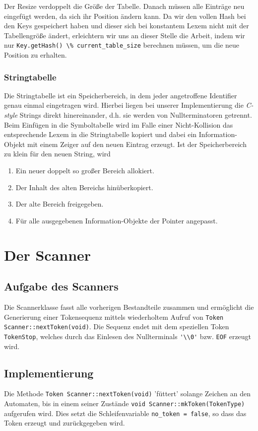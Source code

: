 \documentclass[
a4paper,   %
11pt,      %
oneside,   %
onecolumn, %
final      %
]{article}
\newcommand{\code}[1]{\lstinline$#1$}
\begin{document}
Der Resize verdoppelt die Größe der Tabelle.
Danach müssen alle Einträge neu eingefügt werden, da sich ihr Position ändern kann.
Da wir den vollen Hash bei den Keys gespeichert haben und dieser sich bei konstantem Lexem nicht mit der Tabellengröße ändert, erleichtern wir uns an dieser Stelle die Arbeit, indem wir nur \code{Key.getHash() \% current_table_size} berechnen müssen, um die neue Position zu erhalten.

\subsubsection{Stringtabelle}
Die Stringtabelle ist ein Speicherbereich, in dem jeder angetroffene Identifier genau einmal eingetragen wird.
Hierbei liegen bei unserer Implementierung die \emph{C-style} Strings direkt hinereinander, d.h. sie werden von Nullterminatoren getrennt.
Beim Einfügen in die Symboltabelle wird im Falle einer Nicht-Kollision das entsprechende Lexem in die Stringtabelle kopiert und dabei ein Information-Objekt mit einem Zeiger auf den neuen Eintrag erzeugt.
Ist der Speicherbereich zu klein für den neuen String, wird
\begin{enumerate}
\item Ein neuer doppelt so großer Bereich allokiert. 
\item Der Inhalt des alten Bereichs hinüberkopiert.
\item Der alte Bereich freigegeben.
\item Für alle ausgegebenen Information-Objekte der Pointer angepasst.
\end{enumerate}



\section{Der Scanner} \label{sec:scanner}

\subsection{Aufgabe des Scanners}
Die Scannerklasse fasst alle vorherigen Bestandteile zusammen und ermöglicht die Generierung einer Tokensequenz mittels wiederholtem Aufruf von \code{Token Scanner::nextToken(void)}. Die Sequenz endet mit dem speziellen Token \texttt{TokenStop}, welches durch das Einlesen des Nullterminals \code{'\\0'} bzw. \texttt{EOF} erzeugt wird.


\subsection{Implementierung} \label{ssec:scanimpl}
Die Methode \code{Token Scanner::nextToken(void)} 'füttert' solange Zeichen an den Automaten, bis in einem seiner Zustände \code{void Scanner::mkToken(TokenType)} aufgerufen wird.
Dies setzt die Schleifenvariable \code{no_token = false}, so dass das Token erzeugt und zurückgegeben wird.
\end{document}
